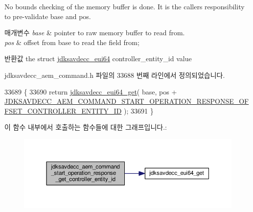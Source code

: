 No bounds checking of the memory buffer is done. It is the caller\textquotesingle{}s responsibility to pre-\/validate base and pos.


\begin{DoxyParams}{매개변수}
{\em base} & pointer to raw memory buffer to read from. \\
\hline
{\em pos} & offset from base to read the field from; \\
\hline
\end{DoxyParams}
\begin{DoxyReturn}{반환값}
the struct \hyperlink{structjdksavdecc__eui64}{jdksavdecc\+\_\+eui64} controller\+\_\+entity\+\_\+id value 
\end{DoxyReturn}


jdksavdecc\+\_\+aem\+\_\+command.\+h 파일의 33688 번째 라인에서 정의되었습니다.


\begin{DoxyCode}
33689 \{
33690     \textcolor{keywordflow}{return} \hyperlink{group__eui64_ga2652311a25a6b91cddbed75c108c7031}{jdksavdecc\_eui64\_get}( base, pos + 
      \hyperlink{group__command__start__operation__response_ga738a0042fd569fe2e23a629809b88dbd}{JDKSAVDECC\_AEM\_COMMAND\_START\_OPERATION\_RESPONSE\_OFFSET\_CONTROLLER\_ENTITY\_ID}
       );
33691 \}
\end{DoxyCode}


이 함수 내부에서 호출하는 함수들에 대한 그래프입니다.\+:
\nopagebreak
\begin{figure}[H]
\begin{center}
\leavevmode
\includegraphics[width=350pt]{group__command__start__operation__response_ga38059c393d730193cb2c300436d132c7_cgraph}
\end{center}
\end{figure}


